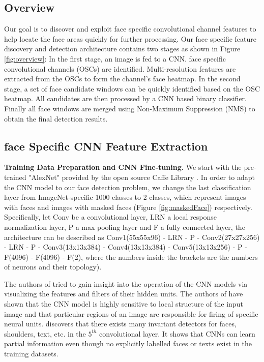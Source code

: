 \documentclass[10pt,twocolumn,letterpaper]{article}
\begin{document}
\subsection{Overview}
Our goal is to discover and exploit face specific convolutional channel features to help locate the face areas quickly for further processing. 
Our face specific feature discovery and detection architecture contains two stages as shown in Figure \ref{fig:overview}: In the first stage, an image is fed to a CNN. face specific convolutional channels (OSCs) are identified. Multi-resolution features are extracted from the OSCs to form the channel's face heatmap. In the second stage, a set of face candidate windows can be quickly identified based on the OSC heatmap. All candidates are then processed by a CNN based binary classifier. Finally all face windows are merged using Non-Maximum Suppression (NMS) \cite{neubeck2006efficient} to obtain the final detection results.

\subsection{face Specific CNN Feature Extraction}


{\bf Training Data Preparation and CNN Fine-tuning.} We start with the pre-trained "AlexNet" \cite{krizhevsky2012imagenet} provided by the open source Caffe Library \cite{jia2014caffe}. In order to adapt the CNN model to our face detection problem, we change the last classification layer from ImageNet-specific 1000 classes to 2 classes, which represent images with faces and images with masked faces (Figure \ref{fig:maskedFace}) respectively. Specifically, let Conv be a convolutional layer, LRN a local response normalization layer, P a max pooling layer and F a fully connected layer, the architecture can be described as Conv1(55x55x96) - LRN - P - Conv2(27x27x256) - LRN - P - Conv3(13x13x384) - Conv4(13x13x384) - Conv5(13x13x256) - P - F(4096) - F(4096) - F(2), where the numbers inside the brackets are the numbers of neurons and their topology).

The authors of \cite{yosinski2015understanding,zeiler2014visualizing} tried to gain insight into the operation of the CNN models via visualizing the features and filters of their hidden units. The authors of \cite{zeiler2014visualizing} have shown that the CNN model is highly sensitive to local structure of the input image and that particular regions of an image are responsible for firing of specific neural units. \cite{yosinski2015understanding} discovers that there exists many invariant detectors for faces, shoulders, text, etc. in the $5^{th}$ convolutional layer. It shows that CNNs can learn partial information even though no explicitly labelled faces or texts exist in the training datasets. 
\end{document}
